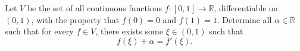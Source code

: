\documentclass{article}
\begin{document}
\setlength{\parindent}{0pt}
Let \(\displaystyle V\) be the set of all continuous functions \(\displaystyle f\colon[0,1] \to \mathbb{R}\), differentiable on \(\displaystyle (0,1)\), with the property that \(\displaystyle f(0)=0\) and \(\displaystyle f(1)=1\). Determine all \(\displaystyle \alpha\in\mathbb{R}\) such that for every \(\displaystyle f\in V\), there exists some \(\displaystyle \xi\in(0,1)\) such that$$f(\xi) + \alpha = f'(\xi).$$
\end{document}

